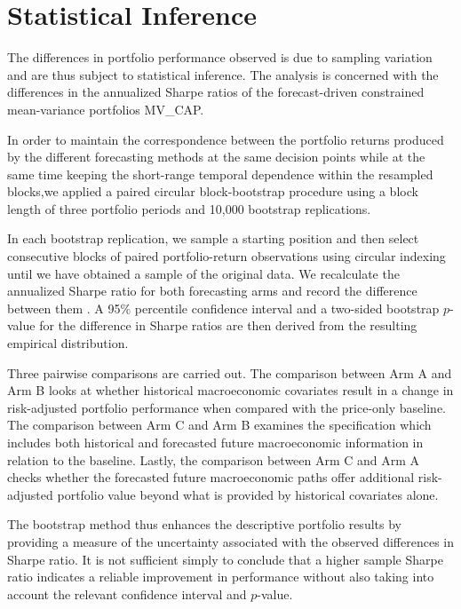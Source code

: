 \documentclass[12pt,a4paper,twoside,openany]{book}
\begin{document}
\section{Statistical Inference}\label{statistical-inference}

The differences in portfolio performance observed is due to sampling variation and are thus subject to statistical inference. The analysis is concerned with the differences in the annualized Sharpe ratios of the forecast-driven constrained mean-variance portfolios MV\_CAP.

In order to maintain the correspondence between the portfolio returns produced by the different forecasting methods at the same decision points while at the same time keeping the short-range temporal dependence within the resampled blocks,we applied a paired circular block-bootstrap procedure using a block length of three portfolio periods and 10,000 bootstrap replications.

In each bootstrap replication, we sample a starting position and then select consecutive blocks of paired portfolio-return observations using circular indexing until we have obtained a sample of the original data. We recalculate the annualized Sharpe ratio for both forecasting arms and record the difference between them . A 95\% percentile confidence interval and a two-sided bootstrap \(p\)-value for the difference in Sharpe ratios are then derived from the resulting empirical distribution.

Three pairwise comparisons are carried out. The comparison between Arm A and Arm B looks at whether historical macroeconomic covariates result in a change in risk-adjusted portfolio performance when compared with the price-only baseline. The comparison between Arm C and Arm B examines the specification which includes both historical and forecasted future macroeconomic information in relation to the baseline. Lastly, the comparison between Arm C and Arm A checks whether the forecasted future macroeconomic paths offer additional risk-adjusted portfolio value beyond what is provided by historical covariates alone.

The bootstrap method thus enhances the descriptive portfolio results by providing a measure of the uncertainty associated with the observed differences in Sharpe ratio. It is not sufficient simply to conclude that a higher sample Sharpe ratio indicates a reliable improvement in performance without also taking into account the relevant confidence interval and \(p\)-value.
\end{document}
